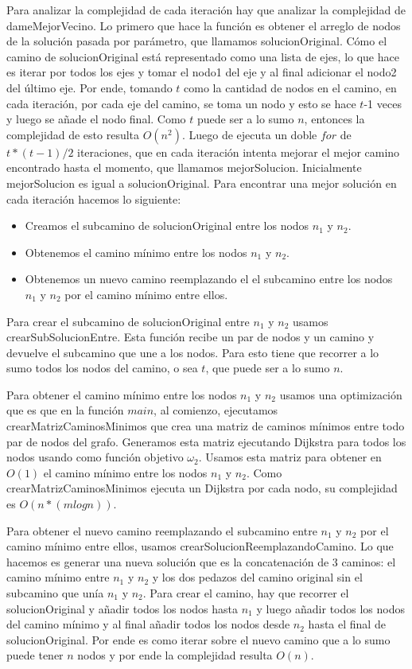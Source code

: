 Para analizar la complejidad de cada iteración hay que analizar la complejidad de dameMejorVecino. 
Lo primero que hace la función es obtener el arreglo de nodos de la solución pasada por parámetro, que llamamos solucionOriginal. Cómo el camino de solucionOriginal está representado como una lista de ejes, lo que hace es iterar por todos los ejes y tomar el nodo1 del eje y al final adicionar el nodo2 del último eje. Por ende, tomando $t$ como la cantidad de nodos en el camino, en cada iteración, por cada eje del camino, se toma un nodo y esto se hace $t$-1 veces y luego se añade el nodo final. Como $t$ puede ser a lo sumo $n$, entonces la complejidad de esto resulta $O(n^2)$.
Luego de ejecuta un doble $for$ de $t * (t-1) / 2$ iteraciones, que en cada iteración intenta mejorar el mejor camino encontrado hasta el momento, que llamamos mejorSolucion. Inicialmente mejorSolucion es igual a solucionOriginal. 
Para encontrar una mejor solución en cada iteración hacemos lo siguiente:

\begin{itemize}
\item Creamos el subcamino de solucionOriginal entre los nodos $n_1$ y $n_2$.
\item Obtenemos el camino mínimo entre los nodos $n_1$ y $n_2$.
\item Obtenemos un nuevo camino reemplazando el el subcamino entre los nodos $n_1$ y $n_2$ por el camino mínimo entre ellos.
\end{itemize}

Para crear el subcamino de solucionOriginal entre $n_1$ y $n_2$ usamos crearSubSolucionEntre. Esta función recibe un par de nodos y un camino y devuelve el subcamino que une a los nodos. Para esto tiene que recorrer a lo sumo todos los nodos del camino, o sea $t$, que puede ser a lo sumo $n$.

Para obtener el camino mínimo entre los nodos $n_1$ y $n_2$ usamos una optimización que es que en la función $main$, al comienzo, ejecutamos crearMatrizCaminosMinimos que crea una matriz de caminos mínimos entre todo par de nodos del grafo. Generamos esta matriz ejecutando Dijkstra para todos los nodos usando como función objetivo $\omega_2$. Usamos esta matriz para obtener en $O(1)$ el camino mínimo entre los nodos $n_1$ y $n_2$.
Como crearMatrizCaminosMinimos ejecuta un Dijkstra por cada nodo, su complejidad es $O(n * (m log n))$.

Para obtener el nuevo camino reemplazando el subcamino entre $n_1$ y $n_2$ por el camino mínimo entre ellos, usamos crearSolucionReemplazandoCamino.
Lo que hacemos es generar una nueva solución que es la concatenación de 3 caminos: el camino mínimo entre $n_1$ y $n_2$ y los dos pedazos del camino original sin el subcamino que unía $n_1$ y $n_2$. Para crear el camino, hay que recorrer el solucionOriginal y añadir todos los nodos hasta $n_1$ y luego añadir todos los nodos del camino mínimo y al final añadir todos los nodos desde $n_2$ hasta el final de solucionOriginal. Por ende es como iterar sobre el nuevo camino que a lo sumo puede tener $n$ nodos y por ende la complejidad resulta $O(n)$.

